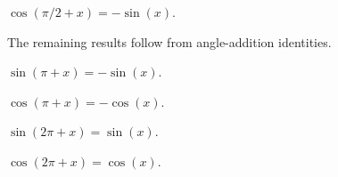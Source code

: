 \begin{proposition}
$\cos(\pi/2 + x) = -\sin(x)$.
\end{proposition}

The remaining results follow from angle-addition identities.

\begin{proposition}
$\sin(\pi + x) = -\sin(x)$.
\end{proposition}

\begin{proposition}
$\cos(\pi + x) = -\cos(x)$.
\end{proposition}

\begin{proposition}
$\sin(2\pi + x) = \sin(x)$.
\end{proposition}

\begin{proposition}
$\cos(2\pi + x) = \cos(x)$.
\end{proposition}
